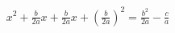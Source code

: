 \documentclass[preview]{standalone}
\begin{document}
\begin{align*}
{x}^{2} + \frac{b}{2 a} x + \frac{b}{2 a} x + {\left( \frac{b}{2 a} \right)}^{2} = \frac{{b}^{2}}{2 a} - \frac{c}{a}
\end{align*}
\end{document}

